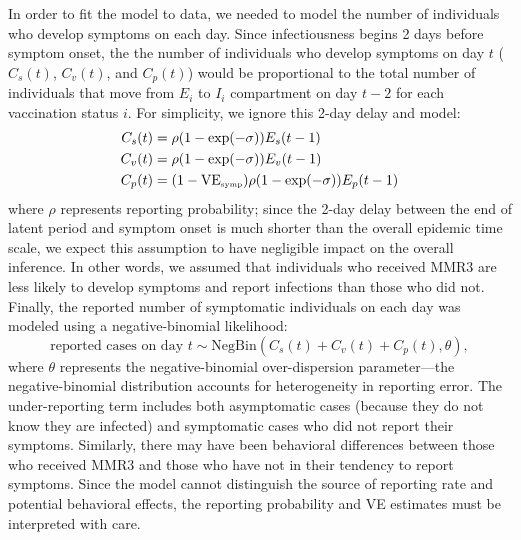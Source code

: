 \documentclass[12pt]{article}
\begin{document}
In order to fit the model to data, we needed to model the number of individuals who develop symptoms on each day.
Since infectiousness begins 2 days before symptom onset, the the number of individuals who develop symptoms on day $t$ ($C_s(t)$, $C_v(t)$, and $C_p(t)$) would be proportional to the total number of individuals that move from $E_i$ to $I_i$ compartment on day $t-2$ for each vaccination status $i$.
For simplicity, we ignore this 2-day delay and model:
\begin{align}
C_s(t) &= \rho (1-\exp(- \sigma)) E_s(t-1)\\
C_v(t) &= \rho (1-\exp(- \sigma)) E_v(t-1)\\
C_p(t) &= (1- \mathrm{VE}_{\textrm{\tiny{symp}}}) \rho (1-\exp(- \sigma)) E_p(t-1)
\end{align}
where $\rho$ represents reporting probability;
since the 2-day delay between the end of latent period and symptom onset is much shorter than the overall epidemic time scale, we expect this assumption to have negligible impact on the overall inference. 
In other words, we assumed that individuals who received MMR3 are less likely to develop symptoms and report infections than those who did not.
Finally, the reported number of symptomatic individuals on each day was modeled using a negative-binomial likelihood:
\begin{equation}
\textrm{reported cases on day } t \sim \mathrm{NegBin}(C_s(t) + C_v(t) + C_p(t), \theta),
\end{equation}
where $\theta$ represents the negative-binomial over-dispersion parameter---the negative-binomial distribution accounts for heterogeneity in reporting error.
The under-reporting term includes both asymptomatic cases (because they do not know they are infected) and symptomatic cases who did not report their symptoms.
Similarly, there may have been behavioral differences between those who received MMR3 and those who have not in their tendency to report symptoms.
Since the model cannot distinguish the source of reporting rate and potential behavioral effects, the reporting probability and VE estimates must be interpreted with care.
\end{document}
